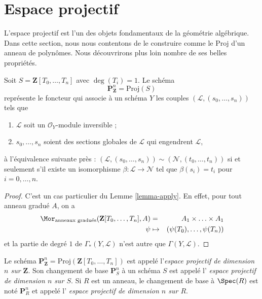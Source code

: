 \section{Espace projectif}
\label{section-projective-space}

\noindent
L'espace projectif est l'un des objets fondamentaux de la géométrie
algébrique. Dans cette section, nous nous contentons de le construire comme le
$\text{Proj}$ d'un anneau de polynômes. Nous découvrirons plus loin nombre de
ses belles propriétés.

\begin{lemma}
\label{lemma-projective-space}
Soit $S = \mathbf{Z}[T_0, \ldots, T_n]$ avec $\deg(T_i) = 1$. Le schéma
$$
\mathbf{P}^n_{\mathbf{Z}} = \text{Proj}(S)
$$
représente le foncteur qui associe à un schéma $Y$ les couples
$(\mathcal{L}, (s_0, \ldots, s_n))$ tels que
\begin{enumerate}
\item $\mathcal{L}$ soit un $\mathcal{O}_Y$-module inversible ;
\item $s_0, \ldots, s_n$ soient des sections globales de $\mathcal{L}$ qui
engendrent $\mathcal{L}$,
\end{enumerate}
à l'équivalence suivante près :
$(\mathcal{L}, (s_0, \ldots, s_n)) \sim
(\mathcal{N}, (t_0, \ldots, t_n))$ si et seulement s'il existe un
isomorphisme $\beta : \mathcal{L} \to \mathcal{N}$ tel que
$\beta(s_i) = t_i$ pour $i = 0, \ldots, n$.
\end{lemma}

\begin{proof}
C'est un cas particulier du Lemme \ref{lemma-apply}. En effet, pour tout
anneau gradué $A$, on a
\begin{eqnarray*}
\Mor_{\text{anneaux gradués}}(\mathbf{Z}[T_0, \ldots, T_n], A)
& = &
A_1 \times \ldots \times A_1 \\
\psi & \mapsto & (\psi(T_0), \ldots, \psi(T_n))
\end{eqnarray*}
et la partie de degré $1$ de $\Gamma_*(Y, \mathcal{L})$ n'est autre que
$\Gamma(Y, \mathcal{L})$.
\end{proof}

\begin{definition}
\label{definition-projective-space}
Le schéma
$\mathbf{P}^n_{\mathbf{Z}} = \text{Proj}(\mathbf{Z}[T_0, \ldots, T_n])$ est
appelé l'{\it espace projectif de dimension $n$ sur $\mathbf{Z}$}.
Son changement de base $\mathbf{P}^n_S$ à un schéma $S$ est appelé l'
{\it espace projectif de dimension $n$ sur $S$}. Si $R$ est un anneau, le
changement de base à $\Spec(R)$ est noté $\mathbf{P}^n_R$ et appelé l'
{\it espace projectif de dimension $n$ sur $R$}.
\end{definition}

